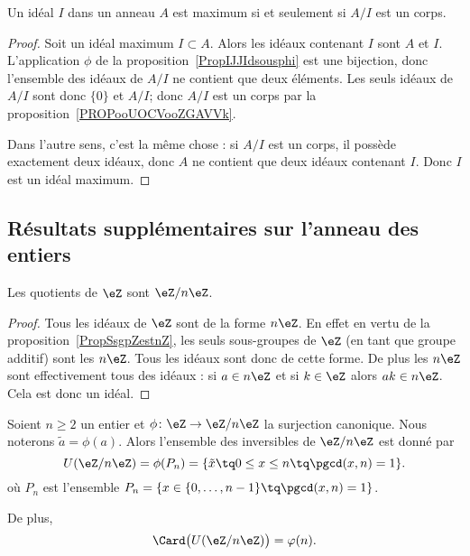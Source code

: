 \begin{proposition}     \label{PROPooSHHWooCyZPPw}
    Un idéal \( I\) dans un anneau \( A \) est maximum si et seulement si \( A/I\) est un corps.
\end{proposition}

\begin{proof}
    Soit un idéal maximum \( I\subset A\). Alors les idéaux contenant \( I\) sont \( A\) et \( I\). L'application \( \phi\) de la proposition~\ref{PropIJJIdsousphi} est une bijection, donc l'ensemble des idéaux de \( A/I\) ne contient que deux éléments. Les seuls idéaux de \( A/I\) sont donc \( \{ 0 \}\) et \( A/I\); donc \( A/I\) est un corps par la proposition~\ref{PROPooUOCVooZGAVVk}.

    Dans l'autre sens, c'est la même chose : si \( A/I\) est un corps, il possède exactement deux idéaux, donc \( A\) ne contient que deux idéaux contenant $I$. Donc \( I\) est un idéal maximum.
\end{proof}

\subsection{Résultats supplémentaires sur l'anneau des entiers}

\begin{corollary}       \label{CORooLINXooBlUKPG}
    Les quotients de \( \eZ\) sont \( \eZ/n\eZ\).
\end{corollary}

\begin{proof}
    Tous les idéaux de \( \eZ\) sont de la forme \( n\eZ\). En effet en vertu de la proposition~\ref{PropSsgpZestnZ}, les seuls sous-groupes de \( \eZ\) (en tant que groupe additif) sont les \( n\eZ\). Tous les idéaux sont donc de cette forme. De plus les \( n\eZ\) sont effectivement tous des idéaux : si \( a\in n\eZ\) et si \( k\in \eZ\) alors \( ak\in n\eZ\). Cela est donc un idéal.
\end{proof}

\begin{proposition}     \label{PropZpintssiprempUzn}
    Soient \( n\geq 2\) un entier et \( \phi\colon \eZ\to \eZ/n\eZ\) la surjection canonique. Nous noterons \( \tilde a=\phi(a)\). Alors l'ensemble des inversibles de \( \eZ/n\eZ\) est donné par
    \begin{equation}
        U(\eZ/n\eZ)=\phi(P_n)=\{ \tilde x\tq 0\leq x\leq n\tq\pgcd(x,n)=1 \}.
    \end{equation}
    où \( P_n\) est l'ensemble $P_n=\{ x\in\{ 0,\ldots,n-1 \}\tq\pgcd(x,n)=1 \}$.

    De plus,
    \begin{equation}
        \Card\big( U(\eZ/n\eZ) \big)=\varphi(n).
    \end{equation}
\end{proposition}

